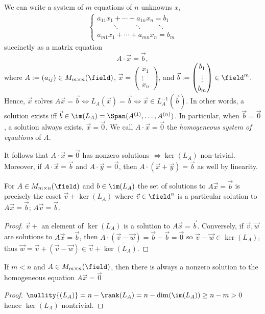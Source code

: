 We can write a system of $m$ equations of $n$ unknowns $x_i$
\begin{align*}
    \begin{cases}
        a_{11}x_1 + \cdots + a_{1n}x_n = b_1\\
        \qquad \ddots \qquad \ddots \qquad \ddots \\
        a_{m1}x_1 + \cdots + a_{mn}x_n = b_m
    \end{cases}
\end{align*}
succinctly as a matrix equation \[
A \cdot \vec{x} = \vec{b},    
\]
where $A := (a_{ij}) \in M_{m \times n}(\field)$, $\vec{x} = \begin{pmatrix}
    x_1\\
    \vdots\\
    x_n
\end{pmatrix}$, and $\vec{b} := \begin{pmatrix}
    b_1\\
    \vdots\\
    b_m
\end{pmatrix} \in \field^m$. Hence, $\vec{x}$ solves $A \vec{x} = \vec{b} \iff L_{A}(\vec{x}) = \vec{b} \iff \vec{x} \in L_{A}^{-1}(\vec{b})$. In other words, a solution exists iff $\vec{b} \in \im(L_A) = \Span(A^{(1)}, \dots, A^{(n)})$. In particular, when $\vec{b} = \vec{0}$, a solution always exists, $\vec{x} = \vec{0}$. We call $A \cdot \vec{x} = \vec{0}$ the \emph{homogeneous system of equations} of $A$. 

It follows that $A \cdot \vec{x} = \vec{0}$ has nonzero solutions $\iff \ker(L_A)$ non-trivial. Moreover, if $A \cdot \vec{x} = \vec{b}$ and $A \cdot \vec{y} = \vec{0}$, then $A\cdot (\vec{x} + \vec{y}) = \vec{b}$ as well by linearity.

\begin{proposition}\label{prop:kernelcoset}
    For $A \in M_{m \times n}(\field)$ and $b \in \im(L_A)$ the set of solutions to $A\vec{x} = \vec{b}$ is precisely the coset $\vec{v} + \ker(L_A)$ where $\vec{v} \in \field^n$ is a particular solution to $A \vec{x} = \vec{b}$; $A \vec{v} = \vec{b}$.
\end{proposition}

\begin{proof}
    $\vec{v} + $ an element of $\ker(L_A)$ is a solution to $A \vec{x} = \vec{b}$. Conversely, if $\vec{v}, \vec{w}$ are solutions to $A \vec{x} = \vec{b}$, then $A \cdot (\vec{v} - \vec{w}) = \vec{b} - \vec{b} = \vec{0}$ so $\vec{v} - \vec{w} \in \ker(L_A)$, thus $\vec{w} = \vec{v} + (\vec{v} - \vec{w}) \in \vec{v} + \ker(L_{A})$.
\end{proof}

\begin{corollary}
    If $m < n$ and $A \in M_{m \times n}(\field)$, then there is always a nonzero solution to the homogeneous equation $A \vec{x} = \vec{0}$
\end{corollary}

\begin{proof}
    $\nullity{(L_A)} = n - \rank(L_A) = n - \dim(\im(L_A)) \geq n - m > 0$ hence $\ker(L_A)$ nontrivial.
\end{proof}